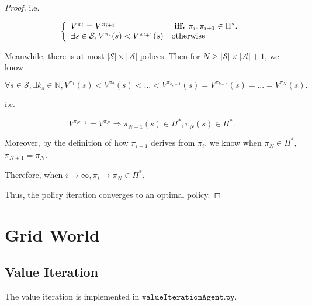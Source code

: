 \documentclass{article}
\begin{document}
\begin{proof}
    \vspace{0.5em} \hspace{1.3em}
    i.e.
    
    \vspace{-1em}
    $$
    \left\{
        \begin{array}{ll}
            V^{\pi_i}=V^{\pi_{i+1}} & \text{ \textbf{iff.} } \pi_i,\pi_{i+1}\in\Pi^*.\\
            \exists s\in\mathcal{S}, V^{\pi_i}(s)<V^{\pi_{i+1}}(s) & \text{otherwise} 
        \end{array}
    \right.
    $$

    \vspace{.3em} \hspace{1.3em}
    Meanwhile, there is at most $|\mathcal{S}|\times|\mathcal{A}|$ polices.
    Then for $N\geq|\mathcal{S}|\times|\mathcal{A}|+1$, we know 

    \vspace{-1em}
    $$\forall s\in\mathcal{S}, \exists k_{s}\in\mathbb{N}, V^{\pi_1}(s)<V^{\pi_2}(s)<...<V^{\pi_{k_s-1}}(s)=V^{\pi_{k-s}}(s)=...=V^{\pi_N}(s).$$

    \hspace{1.3em}
    i.e.

    \vspace{-2em}
    $$V^{\pi_{N-1}} = V^{\pi_N} \Longrightarrow \pi_{N-1}(s) \in\Pi^*, \pi_N(s)\in\Pi^*.$$

    \hspace{1.3em}
    Moreover, by the definition of how $\pi_{i+1}$ derives from $\pi_i$, we know when $\pi_N\in\Pi^*$, $\pi_{N+1}=\pi_N$.

    \hspace{1.3em}
    Therefore, when $i\to\infty, \pi_i\to\pi_N\in\Pi^*$.
    
    \hspace{1.3em}
    Thus, the policy iteration converges to an optimal policy.
\end{proof}

\vspace{3em}
\section{Grid World}

\subsection{Value Iteration}
    The value iteration is implemented in $\mathtt{valueIterationAgent.py}$.
\end{document}
